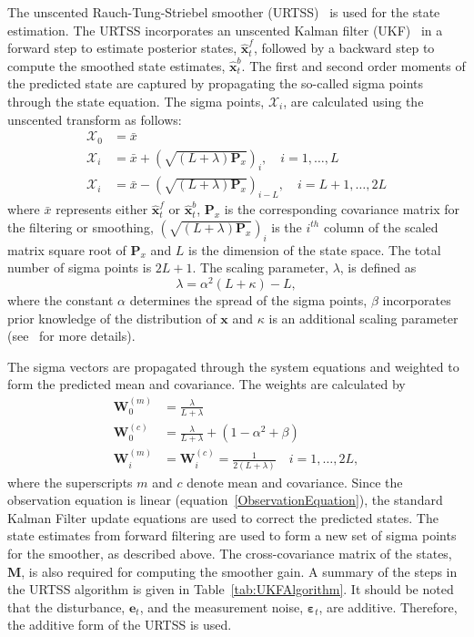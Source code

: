 \documentclass[10pt]{article}
\begin{document}
The unscented Rauch-Tung-Striebel smoother (URTSS)~\cite{Sarkka2010} is used for the state estimation. The URTSS incorporates an unscented Kalman filter (UKF)~\cite{Julier1997, Merwe2003} in a forward step to estimate posterior states, $\hat{\mathbf x}_t^{f}$, followed by a backward step to compute the smoothed state estimates, $\hat{\mathbf x}_t^{b}$. The first and second order moments of the predicted state are captured by propagating the so-called sigma points through the state equation. The sigma points, $\mathcal X_i$, are calculated using the unscented transform as follows:
\begin{align}\label{eq:sigmapoints1}
	\mathcal X_{0}&=\bar x \\
	\mathcal X_{i}&=\bar x+\left(\sqrt{( L + \lambda)\mathbf P_x}\right)_i, \quad i=1, \dots, L \\
	\mathcal X_{i}&=\bar x-\left(\sqrt{( L + \lambda)\mathbf P_x}\right)_{i- L}, \quad i= L+1, \dots, 2L 
\end{align}
where $\bar x$ represents either $\hat{\mathbf x}_t^{f}$ or $\hat{\mathbf x}_t^{b}$, $\mathbf{P}_x$ is the corresponding covariance matrix for the filtering or smoothing, $\left(\sqrt{( L + \lambda)\mathbf P_x}\right)_i$ is the $i^{th}$ column of the scaled matrix square root of $\mathbf P_x$ and $L$ is the dimension of the state space. The total number of sigma points is $2L+1$. The scaling parameter, $\lambda$, is defined as 
\begin{equation}\label{eq:sigmapoints3}
	\lambda=\alpha^2( L+\kappa) - L, 
\end{equation}
where the constant $\alpha$ determines the spread of the sigma points, $\beta$ incorporates prior knowledge of the distribution of $\mathbf{x}$ and $\kappa$ is an additional scaling parameter (see~\cite{Haykin2001} for more details). 

The sigma vectors are propagated through the system equations and weighted to form the predicted mean and covariance. The weights are calculated by 
\begin{align}
	\mathbf W_0^{(m)}&=\frac{\lambda}{ L+\lambda} \\
	\mathbf W_0^{(c)}&=\frac{\lambda}{ L+\lambda}+(1-\alpha^2+\beta) \\
	\mathbf W_i^{(m)}&=\mathbf W_i^{(c)}=\frac{1}{2( L+\lambda)} \quad i=1, \dots, 2L, 
\end{align}
where the superscripts $m$ and $c$ denote mean and covariance. Since the observation equation is linear (equation~\ref{ObservationEquation}), the standard Kalman Filter update equations are used to correct the predicted states. The state estimates from forward filtering are used to form a new set of sigma points for the smoother, as described above. The cross-covariance matrix of the states, $\mathbf M$, is also required for computing the smoother gain. A summary of the steps in the URTSS algorithm is given in Table~\ref{tab:UKFAlgorithm}. It should be noted that the disturbance, $\mathbf{e}_t$, and the measurement noise, $\boldsymbol{\varepsilon}_t$, are additive. Therefore, the additive form of the URTSS is used.
\end{document}
